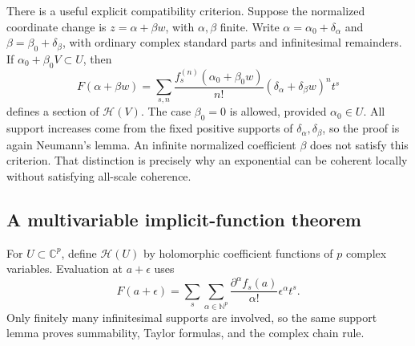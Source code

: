 \documentclass[11pt,oneside]{article}
\numberwithin{equation}{section}
\theoremstyle{definition}
\theoremstyle{remark}\newtheorem{remark}[theorem]{Remark}
\newcommand{\C}{\mathbb C}
\newcommand{\N}{\mathbb N}
\newcommand{\HH}{\mathscr H}
\begin{document}
There is a useful explicit compatibility criterion. Suppose the normalized
coordinate change is $z=\alpha+\beta w$, with $\alpha,\beta$ finite.
Write $\alpha=\alpha_0+\delta_\alpha$ and
$\beta=\beta_0+\delta_\beta$, with ordinary complex standard parts and
infinitesimal remainders. If $\alpha_0+\beta_0V\subset U$, then
\begin{equation}\label{eq:chartchange}
 F(\alpha+\beta w)=
 \sum_{s,n}\frac{f_s^{(n)}(\alpha_0+\beta_0w)}{n!}
       (\delta_\alpha+\delta_\beta w)^n t^s
\end{equation}
defines a section of $\HH(V)$. The case $\beta_0=0$ is allowed, provided
$\alpha_0\in U$. All support increases come from the fixed positive
supports of $\delta_\alpha,\delta_\beta$, so the proof is again Neumann's
lemma. An infinite normalized coefficient $\beta$ does not satisfy this
criterion. That distinction is precisely why an exponential can be
coherent locally without satisfying all-scale coherence.

\subsection{A multivariable implicit-function theorem}
For $U\subset\C^p$, define $\HH(U)$ by holomorphic coefficient
functions of $p$ complex variables. Evaluation at $a+\epsilon$ uses
\[
 F(a+\epsilon)=\sum_s\sum_{\alpha\in\N^p}
       \frac{\partial^\alpha f_s(a)}{\alpha!}\epsilon^\alpha t^s.
\]
Only finitely many infinitesimal supports are involved, so the same support
lemma proves summability, Taylor formulas, and the complex chain rule.
\end{document}
